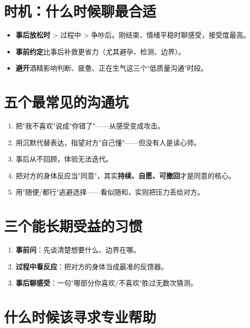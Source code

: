 \section{时机：什么时候聊最合适}

\begin{itemize}[leftmargin=2em,itemsep=0.3em]
  \item \textbf{事后放松时} > 过程中 > 争吵后。刚结束、情绪平稳时聊感受，接受度最高。
  \item \textbf{事前约定}比事后补救更省力（尤其避孕、检测、边界）。
  \item \textbf{避开}酒精影响判断、疲惫、正在生气这三个"低质量沟通"时段。
\end{itemize}

\section{五个最常见的沟通坑}

\begin{enumerate}[leftmargin=2em,itemsep=0.3em]
  \item 把"我不喜欢"说成"你错了"——从感受变成攻击。
  \item 用沉默代替表达，指望对方"自己懂"——但没有人是读心师。
  \item 事后从不回顾，体验无法迭代。
  \item 把对方的身体反应当"同意"，其实\textbf{持续、自愿、可撤回}才是同意的核心。
  \item 用"随便/都行"逃避选择——看似随和，实则把压力丢给对方。
\end{enumerate}

\section{三个能长期受益的习惯}

\begin{enumerate}[leftmargin=2em,itemsep=0.3em]
  \item \textbf{事前问}：先谈清楚想要什么、边界在哪。
  \item \textbf{过程中看反应}：把对方的身体当成最准的反馈器。
  \item \textbf{事后聊感受}：一句"哪部分你喜欢/不喜欢"胜过无数次猜测。
\end{enumerate}

\section{什么时候该寻求专业帮助}

